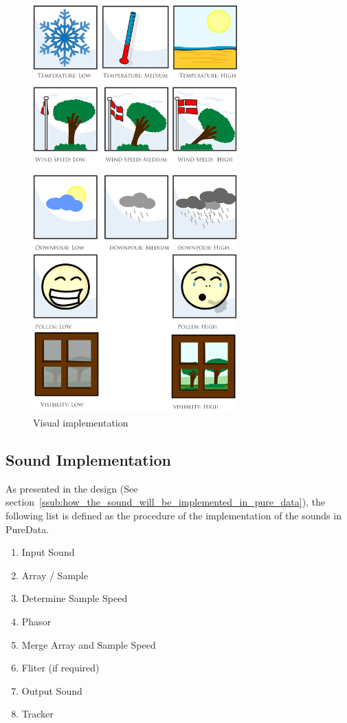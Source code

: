 \begin{figure}[!htbp]
    \centering
    \includegraphics[width=0.7\textwidth]{images/Implementation11.jpg}
    \caption{Visual implementation}
    \label{fig:implementation11}
\end{figure}



\subsection{Sound Implementation} %
\label{sub:sound_implementation}

As presented in the design (See section~\ref{ssub:how_the_sound_will_be_implemented_in_pure_data}), the following list is defined as the procedure of the implementation of the sounds in PureData.

\begin{enumerate}
    \item Input Sound
    \item Array / Sample
    \item Determine Sample Speed
    \item Phasor
    \item Merge Array and Sample Speed
    \item Fliter (if required)
    \item Output Sound
    \item Tracker
\end{enumerate}

